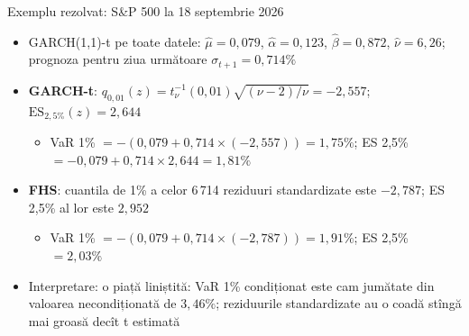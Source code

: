 \begin{frame}{Exemplu rezolvat: S\&P 500 la 18 septembrie 2026}
\itemsize{\footnotesize}
\begin{itemize}
    \item GARCH(1,1)-t pe toate datele: $\hat\mu = 0{,}079$, $\hat\alpha = 0{,}123$, $\hat\beta = 0{,}872$, $\hat\nu = 6{,}26$; prognoza pentru ziua următoare $\sigma_{t+1} = 0{,}714\%$
    \item \textbf{GARCH-t}: $q_{0{,}01}(z) = t_\nu^{-1}(0{,}01)\sqrt{(\nu - 2)/\nu} = -2{,}557$; $\mathrm{ES}_{2{,}5\%}(z) = 2{,}644$
    \begin{itemize}
        \item VaR 1\% $= -(0{,}079 + 0{,}714 \times (-2{,}557)) = 1{,}75\%$; ES 2,5\% $= -0{,}079 + 0{,}714 \times 2{,}644 = 1{,}81\%$
    \end{itemize}
    \item \textbf{FHS}: cuantila de 1\% a celor 6\,714 reziduuri standardizate este $-2{,}787$; ES 2,5\% al lor este $2{,}952$
    \begin{itemize}
        \item VaR 1\% $= -(0{,}079 + 0{,}714 \times (-2{,}787)) = 1{,}91\%$; ES 2,5\% $= 2{,}03\%$
    \end{itemize}
    \item Interpretare: o piață liniștită: VaR 1\% condiționat este cam jumătate din valoarea necondiționată de $3{,}46\%$; reziduurile standardizate au o coadă stîngă mai groasă decît t estimată
\end{itemize}
\end{frame}

